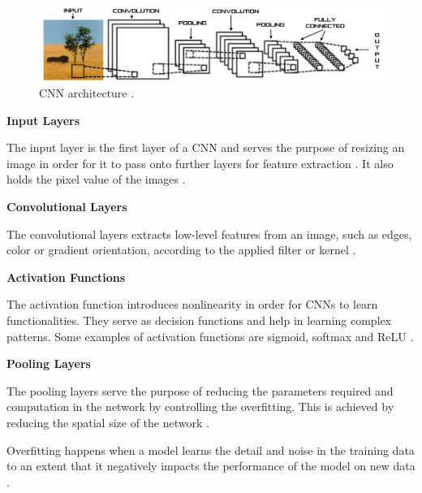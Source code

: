             \vspace{+2.5cm}
            \begin{figure}[H]
                \centering
                \captionsetup{justification=centering}
                \includegraphics[width=\textwidth]{Sections/2StateOfTheArt/2_images/conv.png}
                \caption[CNN architecture]{CNN architecture \cite{Ribeiro}.}  
            \end{figure}

            \newpage
           \par \textbf{Input Layers}
           \par The input layer is the first layer of a CNN and serves the purpose of resizing an image in order for it  to pass onto further layers for feature extraction \cite{Ribeiro}. It also holds the pixel value of the images \cite{OShea2015}. \bigbreak
            
          
           \par \textbf{Convolutional Layers}
           \par The convolutional layers extracts low-level features from an image, such as edges, color or gradient orientation, according to the applied filter or kernel \cite{Ribeiro}. \bigbreak

           \par \textbf{Activation Functions}
           \par The activation function introduces nonlinearity in order for CNNs to learn functionalities. They serve as decision functions and help in learning complex patterns. Some examples of activation functions are sigmoid, softmax and ReLU \cite{Ribeiro}. \bigbreak

           \par \textbf{Pooling Layers} 
           \par The pooling layers serve the purpose of reducing the parameters required and computation in the network by controlling the overfitting. This is achieved by reducing the spatial size of the network \cite{Ribeiro}.
           \par Overfitting happens when a model learns the detail and noise in the training data to an extent that it negatively impacts the performance of the model on new data \cite{OShea2015}. \bigbreak


